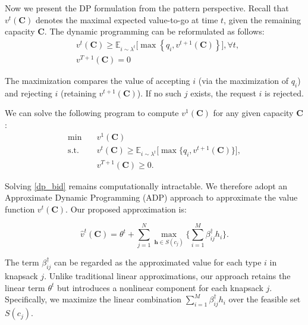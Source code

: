

Now we present the DP formulation from the pattern perspective. Recall that $v^t(\bm{C})$ denotes the maximal expected value-to-go at time $t$, given the remaining capacity $\bm{C}$. The dynamic programming can be reformulated as follows:
\begin{equation}
\begin{aligned}
& v^t(\bm{C}) \geq \mathbb{E}_{i \sim \lambda^t}\bigg[
\max \left\{q_{i}, v^{t+1}(\bm{C})\right\}
\bigg], \forall t,  \\
& v^{T+1}(\bm{C}) = 0
\end{aligned}
\end{equation}

The maximization compares the value of accepting $i$ (via the maximization of $q_{i}$) and rejecting $i$ (retaining $v^{t+1}(\bm{C})$). If no such $j$ exists, the request $i$ is rejected.


We can solve the following program to compute $v^1(\bm{C})$ for any given capacity $\bm{C}$:
\begin{equation}\label{dp_bid}
    \begin{aligned}
    \min \quad & v^{1}(\bm{C}) \\
    \mathrm{s.t.} \quad & v^{t}(\bm{C}) \geq \mathbb{E}_{i \sim \lambda^t}\bigg[\max\Big\{ q_{i}, v^{t+1}(\bm{C})\Big\}\bigg], \\
    & v^{T+1}(\bm{C}) \geq 0.
    \end{aligned}
\end{equation}

Solving \eqref{dp_bid} remains computationally intractable. We therefore adopt an Approximate Dynamic Programming (ADP) approach \citep{adelman2007dynamic} to approximate the value function $v^{t}(\bm{C})$. Our proposed approximation is:

\begin{equation}\label{appro_dp}
    \hat{v}^{t}(\bm{C}) = \theta^{t} + \sum_{j=1}^{N} \max_{\bm{h} \in S(c_{j})} \{\sum_{i=1}^{M} \beta_{ij}^{\dag} h_{i}\}.
\end{equation}


The term $\beta_{ij}^{\dag}$ can be regarded as the approximated value for each type $i$ in knapsack $j$. Unlike traditional linear approximations, our approach retains the linear term $\theta^{t}$ but introduces a nonlinear component for each knapsack $j$. Specifically, we maximize the linear combination $\sum_{i=1}^{M} \beta_{ij}^{\dag} h_{i}$ over the feasible set $S(c_{j})$.

